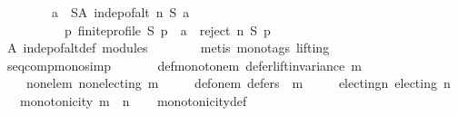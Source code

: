 \begin{isabellebody}
\ \ \ \ \ \ \ \ {\isacharparenleft}{\kern0pt}{\isasymforall}a\ {\isasymin}\ S{\isacharminus}{\kern0pt}A{\isachardot}{\kern0pt}\ indep{\isacharunderscore}{\kern0pt}of{\isacharunderscore}{\kern0pt}alt\ n\ S\ a\ {\isasymand}\isanewline
\ \ \ \ \ \ \ \ \ \ {\isacharparenleft}{\kern0pt}{\isasymforall}p{\isachardot}{\kern0pt}\ finite{\isacharunderscore}{\kern0pt}profile\ S\ p\ {\isasymlongrightarrow}\ a\ {\isasymin}\ reject\ n\ S\ p{\isacharparenright}{\kern0pt}{\isacharparenright}{\kern0pt}{\isachardoublequoteclose}\isanewline
\ \ \ \ \ \ \isamarkupfalse%
\ A\ indep{\isacharunderscore}{\kern0pt}of{\isacharunderscore}{\kern0pt}alt{\isacharunderscore}{\kern0pt}def\ modules\isanewline
\ \ \ \ \ \ \isamarkupfalse%
\ {\isacharparenleft}{\kern0pt}metis\ {\isacharparenleft}{\kern0pt}mono{\isacharunderscore}{\kern0pt}tags{\isacharcomma}{\kern0pt}\ lifting{\isacharparenright}{\kern0pt}{\isacharparenright}{\kern0pt}\isanewline
\ \ \isamarkupfalse%
\isanewline
{}\isamarkupfalse%
%
\endisatagproof
{\isafoldproof}%
%
\isadelimproof
\isanewline
%
\endisadelimproof
\isanewline
\isanewline
{}\isamarkupfalse%
\ seq{\isacharunderscore}{\kern0pt}comp{\isacharunderscore}{\kern0pt}mono{\isacharbrackleft}{\kern0pt}simp{\isacharbrackright}{\kern0pt}{\isacharcolon}{\kern0pt}\isanewline
\ \ \isanewline
\ \ \ \ def{\isacharunderscore}{\kern0pt}monotone{\isacharunderscore}{\kern0pt}m{\isacharcolon}{\kern0pt}\ {\isachardoublequoteopen}defer{\isacharunderscore}{\kern0pt}lift{\isacharunderscore}{\kern0pt}invariance\ m{\isachardoublequoteclose}\ \isanewline
\ \ \ \ non{\isacharunderscore}{\kern0pt}ele{\isacharunderscore}{\kern0pt}m{\isacharcolon}{\kern0pt}\ {\isachardoublequoteopen}non{\isacharunderscore}{\kern0pt}electing\ m{\isachardoublequoteclose}\ \isanewline
\ \ \ \ def{\isacharunderscore}{\kern0pt}one{\isacharunderscore}{\kern0pt}m{\isacharcolon}{\kern0pt}\ {\isachardoublequoteopen}defers\ {}\ m{\isachardoublequoteclose}\ \isanewline
\ \ \ \ electing{\isacharunderscore}{\kern0pt}n{\isacharcolon}{\kern0pt}\ {\isachardoublequoteopen}electing\ n{\isachardoublequoteclose}\isanewline
\ \ \ {\isachardoublequoteopen}monotonicity\ {\isacharparenleft}{\kern0pt}m\ {\isasymtriangleright}\ n{\isacharparenright}{\kern0pt}{\isachardoublequoteclose}\isanewline
%
\isadelimproof
\ \ %
\endisadelimproof
%
\isatagproof
{}\isamarkupfalse%
\ monotonicity{\isacharunderscore}{\kern0pt}def\isanewline
{}\isamarkupfalse%

\end{isabellebody}
